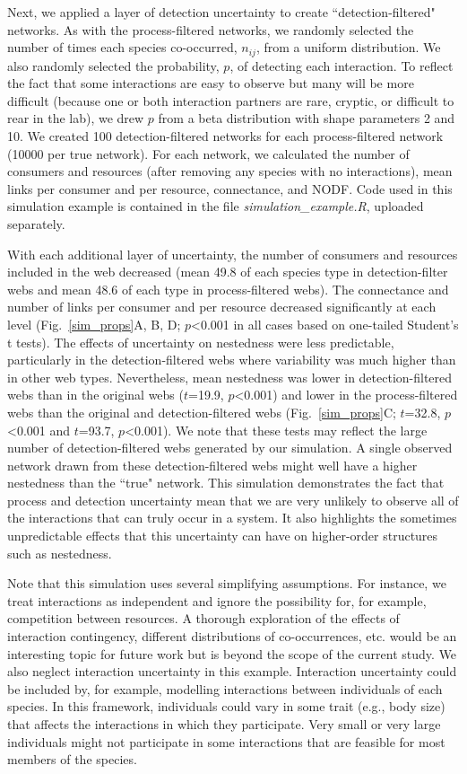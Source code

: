 \documentclass[12pt]{article}
\begin{document}
  Next, we applied a layer of detection uncertainty to create ``detection-filtered" networks. As with the process-filtered networks, we randomly selected the number of times each species co-occurred, $n_{ij}$, from a uniform distribution. We also randomly selected the probability, $p$, of detecting each interaction. To reflect the fact that some interactions are easy to observe but many will be more difficult (because one or both interaction partners are rare, cryptic, or difficult to rear in the lab), we drew $p$ from a beta distribution with shape parameters 2 and 10. We created 100 detection-filtered networks for each process-filtered network (10000 per true network). For each network, we calculated the number of consumers and resources (after removing any species with no interactions), mean links per consumer and per resource, connectance, and NODF. Code used in this simulation example is contained in the file \emph{simulation\_example.R}, uploaded separately.


  With each additional layer of uncertainty, the number of consumers and resources included in the web decreased (mean 49.8 of each species type in detection-filter webs and mean 48.6 of each type in process-filtered webs). The connectance and number of links per consumer and per resource decreased significantly at each level (Fig.~\ref{sim_props}A, B, D; $p$\textless0.001 in all cases based on one-tailed Student's t tests). The effects of uncertainty on nestedness were less predictable, particularly in the detection-filtered webs where variability was much higher than in other web types. Nevertheless, mean nestedness was lower in detection-filtered webs than in the original webs ($t$=19.9, $p$\textless0.001) and lower in the process-filtered webs than the original and detection-filtered webs (Fig.~\ref{sim_props}C; $t$=32.8, $p$\textless0.001 and $t$=93.7, $p$\textless0.001). We note that these tests may reflect the large number of detection-filtered webs generated by our simulation. A single observed network drawn from these detection-filtered webs might well have a higher nestedness than the ``true" network. This simulation demonstrates the fact that process and detection uncertainty mean that we are very unlikely to observe all of the interactions that can truly occur in a system. It also highlights the sometimes unpredictable effects that this uncertainty can have on higher-order structures such as nestedness.


  Note that this simulation uses several simplifying assumptions. For instance, we treat interactions as independent and ignore the possibility for, for example, competition between resources. A thorough exploration of the effects of interaction contingency, different distributions of co-occurrences, etc. would be an interesting topic for future work but is beyond the scope of the current study. We also neglect interaction uncertainty in this example. Interaction uncertainty could be included by, for example, modelling interactions between individuals of each species. In this framework, individuals could vary in some trait (e.g., body size) that affects the interactions in which they participate. Very small or very large individuals might not participate in some interactions that are feasible for most members of the species. 
\end{document}
